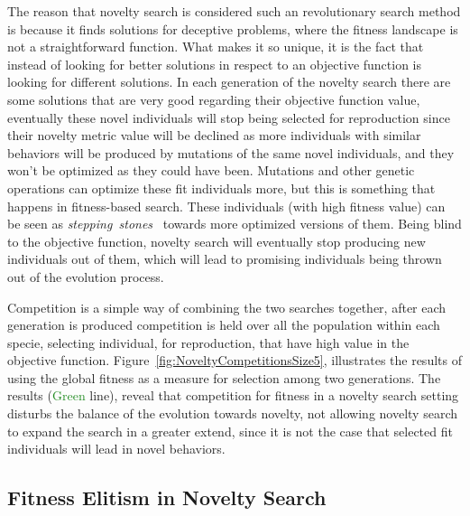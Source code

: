 The reason that novelty search is considered such an revolutionary search method is because it finds solutions for deceptive problems, where the fitness landscape is not a straightforward function. What makes it so unique, it is the fact that instead of looking for better solutions in respect to an objective function is looking for different solutions. In each generation of the novelty search there are some solutions that are very good regarding their objective function value, eventually these novel individuals will stop being selected for reproduction since their novelty metric value will be declined as more individuals with similar behaviors will be produced by mutations of the same novel individuals, and they won't be optimized as they could have been. Mutations and other genetic operations can optimize these fit individuals more, but this is something that happens in fitness-based search. These individuals (with high fitness value) can be seen as \emph{stepping~stones}~\citep{lehman2011abandoning} towards more optimized versions of them. Being blind to the objective function, novelty search will eventually stop producing new individuals out of them, which will lead to promising individuals being thrown out of the evolution process. 

Competition is a simple way of combining the two searches together, after each generation is produced competition is held over all the population within each specie, selecting individual, for reproduction, that have high value in the objective function. Figure~\ref{fig:NoveltyCompetitionsSize5}, illustrates the results of using the global fitness as a measure for selection among two generations. The results (\textcolor{ForestGreen}{Green} line), reveal that competition for fitness in a novelty search setting disturbs the balance of the evolution towards novelty, not allowing novelty search to expand the search in a greater extend, since it is not the case that selected fit individuals will lead in novel behaviors. 






\subsection*{Fitness Elitism in Novelty Search}

